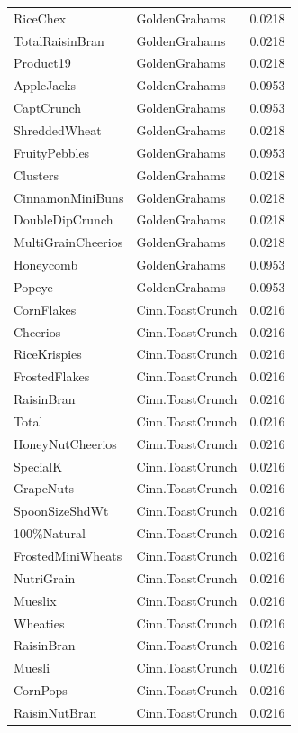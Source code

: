 \begin{longtable}{llr}
RiceChex & GoldenGrahams & 0.0218 \\
TotalRaisinBran & GoldenGrahams & 0.0218 \\
Product19 & GoldenGrahams & 0.0218 \\
AppleJacks & GoldenGrahams & 0.0953 \\
CaptCrunch & GoldenGrahams & 0.0953 \\
ShreddedWheat & GoldenGrahams & 0.0218 \\
FruityPebbles & GoldenGrahams & 0.0953 \\
Clusters & GoldenGrahams & 0.0218 \\
CinnamonMiniBuns & GoldenGrahams & 0.0218 \\
DoubleDipCrunch & GoldenGrahams & 0.0218 \\
MultiGrainCheerios & GoldenGrahams & 0.0218 \\
Honeycomb & GoldenGrahams & 0.0953 \\
Popeye & GoldenGrahams & 0.0953 \\
CornFlakes & Cinn.ToastCrunch & 0.0216 \\
Cheerios & Cinn.ToastCrunch & 0.0216 \\
RiceKrispies & Cinn.ToastCrunch & 0.0216 \\
FrostedFlakes & Cinn.ToastCrunch & 0.0216 \\
RaisinBran & Cinn.ToastCrunch & 0.0216 \\
Total & Cinn.ToastCrunch & 0.0216 \\
HoneyNutCheerios & Cinn.ToastCrunch & 0.0216 \\
SpecialK & Cinn.ToastCrunch & 0.0216 \\
GrapeNuts & Cinn.ToastCrunch & 0.0216 \\
SpoonSizeShdWt & Cinn.ToastCrunch & 0.0216 \\
100\%Natural & Cinn.ToastCrunch & 0.0216 \\
FrostedMiniWheats & Cinn.ToastCrunch & 0.0216 \\
NutriGrain & Cinn.ToastCrunch & 0.0216 \\
Mueslix & Cinn.ToastCrunch & 0.0216 \\
Wheaties & Cinn.ToastCrunch & 0.0216 \\
RaisinBran & Cinn.ToastCrunch & 0.0216 \\
Muesli & Cinn.ToastCrunch & 0.0216 \\
CornPops & Cinn.ToastCrunch & 0.0216 \\
RaisinNutBran & Cinn.ToastCrunch & 0.0216 \\

\end{longtable}
